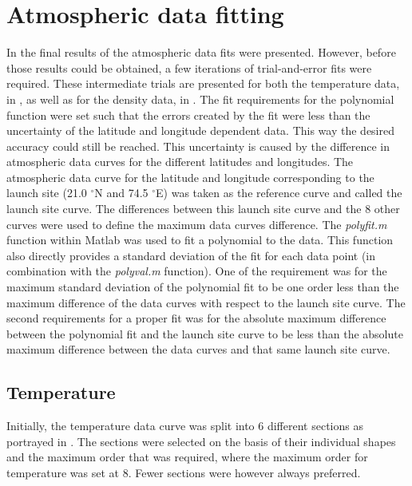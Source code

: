 \chapter{Atmospheric data fitting}
\label{app:appendixB-fittingProcessAndResults}
In  the final results of the atmospheric data fits were presented. However, before those results could be obtained, a few iterations of trial-and-error fits were required. These intermediate trials are presented for both the temperature data, in , as well as for the density data, in . The fit requirements for the polynomial function were set such that the errors created by the fit were less than the uncertainty of the latitude and longitude dependent data. This way the desired accuracy could still be reached. This uncertainty is caused by the difference in atmospheric data curves for the different latitudes and longitudes. The atmospheric data curve for the latitude and longitude corresponding to the launch site (21.0 $^\circ$N and 74.5 $^\circ$E) was taken as the reference curve and called the launch site curve. The differences between this launch site curve and the 8 other curves were used to define the maximum data curves difference. The \textit{polyfit.m} function within Matlab was used to fit a polynomial to the data. This function also directly provides a standard deviation of the fit for each data point (in combination with the \textit{polyval.m} function). One of the requirement was for the maximum standard deviation of the polynomial fit to be one order less than the maximum difference of the data curves with respect to the launch site curve. The second requirements for a proper fit was for the absolute maximum difference between the polynomial fit and the launch site curve to be less than the absolute maximum difference between the data curves and that same launch site curve. 


\section{Temperature}
\label{appsec:tempFit}
Initially, the temperature data curve was split into 6 different sections as portrayed in . The sections were selected on the basis of their individual shapes and the maximum order that was required, where the maximum order for temperature was set at 8. Fewer sections were however always preferred. 

